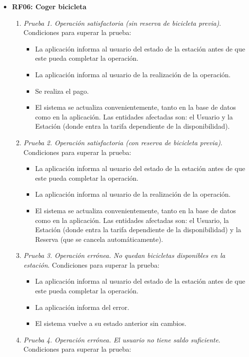 \begin{itemize}
	\item \textbf{RF06: Coger bicicleta}
	\begin{enumerate}
		\item \textit{Prueba 1. Operación satisfactoria (sin reserva de bicicleta previa)}. Condiciones para superar la prueba:
		\begin{itemize}
			\item La aplicación informa al usuario del estado de la estación antes de que este pueda completar la operación.
			\item La aplicación informa al usuario de la realización de la operación.
			\item Se realiza el pago.
			\item El sistema se actualiza convenientemente, tanto en la base de datos como en la aplicación. Las entidades afectadas son: el Usuario y la Estación (donde entra la tarifa dependiente de la disponibilidad).
		\end{itemize}
		\item \textit{Prueba 2. Operación satisfactoria (con reserva de bicicleta previa)}. Condiciones para superar la prueba:
		\begin{itemize}
			\item La aplicación informa al usuario del estado de la estación antes de que este pueda completar la operación.
			\item La aplicación informa al usuario de la realización de la operación.
			\item El sistema se actualiza convenientemente, tanto en la base de datos como en la aplicación. Las entidades afectadas son: el Usuario, la Estación (donde entra la tarifa dependiente de la disponibilidad) y la Reserva (que se cancela automáticamente).
		\end{itemize}
		\item \textit{Prueba 3. Operación errónea. No quedan bicicletas disponibles en la estación}. Condiciones para superar la prueba:
		\begin{itemize}
			\item La aplicación informa al usuario del estado de la estación antes de que este pueda completar la operación.
			\item La aplicación informa del error.
			\item El sistema vuelve a su estado anterior sin cambios.
		\end{itemize}
		\item \textit{Prueba 4. Operación errónea. El usuario no tiene saldo suficiente}. Condiciones para superar la prueba:

\end{enumerate}
\end{itemize}
